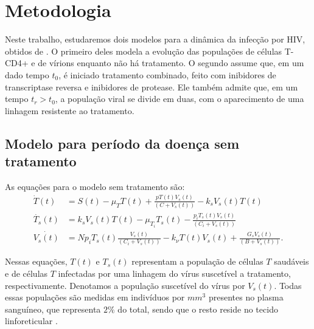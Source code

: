 \section{Metodologia}

Neste trabalho, estudaremos dois modelos para a dinâmica da infecção por HIV, obtidos de \cite{model-combined}.
O primeiro deles modela a evolução das populações de células T-CD4+ e de vírions enquanto não há tratamento.
O segundo assume que, em um dado tempo \( t_{ 0 } \), é iniciado tratamento combinado, feito com inibidores de transcriptase reversa e inibidores de protease.
Ele também admite que, em um tempo \( t_{ r } > t_{ 0 } \), a população viral se divide em duas, com o aparecimento de uma linhagem resistente ao tratamento.

\subsection{Modelo para período da doença sem tratamento}

As equações para o modelo sem tratamento são:
\begin{align}
    \dot{T}( t ) &= S ( t ) - \mu_{ T } T ( t ) + \frac{ p T ( t ) V_{ s } ( t ) }{ ( C + V_{ s } ( t ) ) } - k_{ s } V_{ s } ( t ) T ( t ) \label{Tponto_S}\\
    \dot{T_{ s }} ( t ) &= k_{ s } V_{ s } ( t ) T ( t ) - \mu_{ T_{ i } } T_{ s } ( t ) - \frac{ p_{ i } T_{ s } ( t ) V_{ s } ( t ) }{ ( C_{ i } + V_{ s } ( t ) ) } \label{Tsponto_S} \\
    \dot{V_{ s } ( t )} &= N p_{ i } T_{ s } ( t ) \frac{ V_{ s } ( t ) }{ ( C_{ i } + V_{ s } ( t ) ) } - k_{ \nu } T ( t ) V_{ s } ( t ) + \frac{ G_{ s } V_{ s } ( t ) }{ ( B + V_{ s } ( t ) ) } \label{Vsponto_S}
.\end{align}

Nessas equações, \( T ( t ) \) e \( T_{ s } ( t ) \) representam a população de células \( T \) saudáveis e de células \( T \) infectadas por uma linhagem do vírus suscetível a tratamento, respectivamente.
Denotamos a população suscetível do vírus por \( V_{ s } ( t ) \).
Todas essas populações são medidas em indivíduos por \( \unit{mm^{ 3 }} \) presentes no plasma sanguíneo, que representa \( 2 \% \) do total, sendo que o resto reside no tecido linforeticular \cite{model-combined}.

